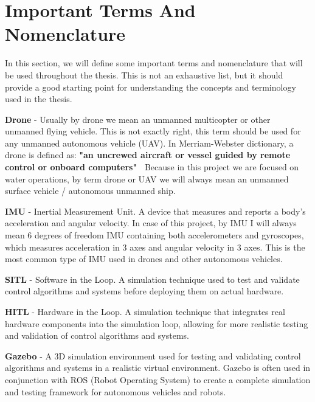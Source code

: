 \section{Important Terms And Nomenclature}

In this section, we will define some important terms and nomenclature that will be used throughout the thesis. This is not an exhaustive list, but it should provide a good starting point for understanding the concepts and terminology used in the thesis.

\vspace{1cm}
\textbf{Drone} - Usually by drone we mean an unmanned multicopter or other unmanned flying vehicle. This is not exactly right, this term should be used for any unmanned autonomous vehicle (UAV). In Merriam-Webster dictionary, a drone is defined as:
\textbf{"an uncrewed aircraft or vessel guided by remote control or onboard computers"~\cite{merriam_webster_drone} }
Because in this project we are focused on water operations, by term drone or UAV we will always mean an unmanned surface vehicle / autonomous unmanned ship.



\vspace{0.5cm}
\textbf{IMU} - Inertial Measurement Unit. A device that measures and reports a body's acceleration and angular velocity. In case of this project, by IMU I will always mean 6 degrees of freedom IMU containing both accelerometers and gyroscopes, which measures acceleration in 3 axes and angular velocity in 3 axes. This is the most common type of IMU used in drones and other autonomous vehicles.


\vspace{0.5cm}
\textbf{SITL} - Software in the Loop. A simulation technique used to test and validate control algorithms and systems before deploying them on actual hardware.

\vspace{0.5cm}
\textbf{HITL} - Hardware in the Loop. A simulation technique that integrates real hardware components into the simulation loop, allowing for more realistic testing and validation of control algorithms and systems.


\vspace{0.5cm}
\textbf{Gazebo} - A 3D simulation environment used for testing and validating control algorithms and systems in a realistic virtual environment. Gazebo is often used in conjunction with ROS (Robot Operating System) to create a complete simulation and testing framework for autonomous vehicles and robots.

\newpage
